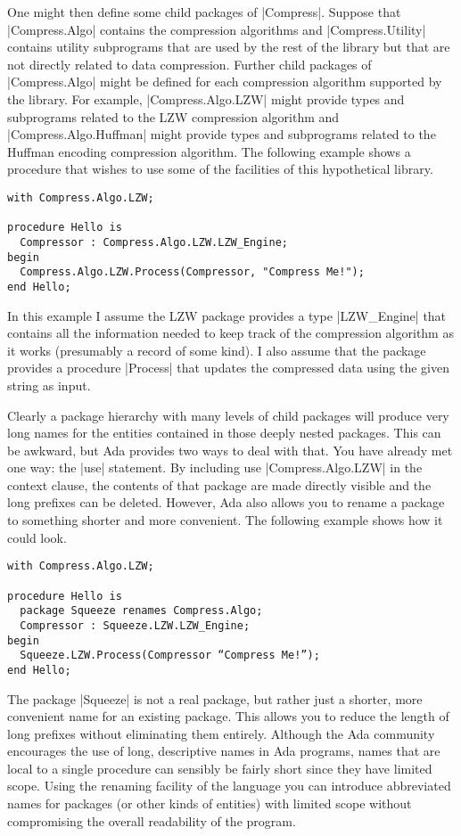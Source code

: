One might then define some child packages of |Compress|. Suppose that |Compress.Algo| contains
the compression algorithms and |Compress.Utility| contains utility subprograms that are used by
the rest of the library but that are not directly related to data compression. Further child
packages of |Compress.Algo| might be defined for each compression algorithm supported by the
library. For example, |Compress.Algo.LZW| might provide types and subprograms related to the LZW
compression algorithm and |Compress.Algo.Huffman| might provide types and subprograms related to
the Huffman encoding compression algorithm. The following example shows a procedure that wishes
to use some of the facilities of this hypothetical library.

\begin{lstlisting}
with Compress.Algo.LZW;

procedure Hello is
  Compressor : Compress.Algo.LZW.LZW_Engine;
begin
  Compress.Algo.LZW.Process(Compressor, "Compress Me!");
end Hello;
\end{lstlisting}

In this example I assume the LZW package provides a type |LZW_Engine| that contains all the
information needed to keep track of the compression algorithm as it works (presumably a record
of some kind). I also assume that the package provides a procedure |Process| that updates the
compressed data using the given string as input.

Clearly a package hierarchy with many levels of child packages will produce very long names for
the entities contained in those deeply nested packages. This can be awkward, but Ada provides
two ways to deal with that. You have already met one way: the |use| statement. By including use
|Compress.Algo.LZW| in the context clause, the contents of that package are made directly
visible and the long prefixes can be deleted. However, Ada also allows you to rename a package
to something shorter and more convenient. The following example shows how it could look.

\begin{lstlisting}
with Compress.Algo.LZW;

procedure Hello is
  package Squeeze renames Compress.Algo;
  Compressor : Squeeze.LZW.LZW_Engine;
begin
  Squeeze.LZW.Process(Compressor “Compress Me!”);
end Hello;
\end{lstlisting}

The package |Squeeze| is not a real package, but rather just a shorter, more convenient name for
an existing package. This allows you to reduce the length of long prefixes without eliminating
them entirely. Although the Ada community encourages the use of long, descriptive names in Ada
programs, names that are local to a single procedure can sensibly be fairly short since they
have limited scope. Using the renaming facility of the language you can introduce abbreviated
names for packages (or other kinds of entities) with limited scope without compromising the
overall readability of the program.


